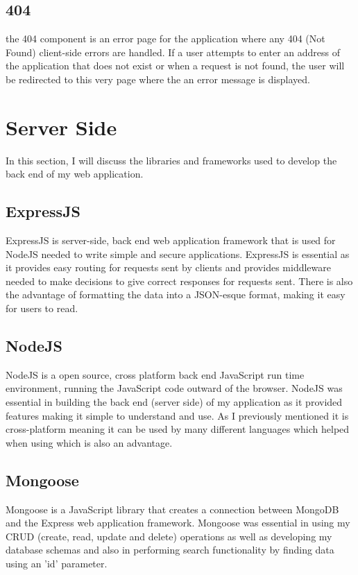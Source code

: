 \subsection{404}

the 404 component is an error page for the application where any 404 (Not Found) client-side errors are handled. If a user attempts to enter an address of the application that does not exist or when a request is not found, the user will be redirected to this very page where the an error message is displayed. 

\section{Server Side}

In this section, I will discuss the libraries and frameworks used to develop the back end of my web application.

\subsection{ExpressJS}

ExpressJS is server-side, back end web application framework that is used for NodeJS needed to write simple and secure applications. ExpressJS is essential as it provides easy routing for requests sent by clients and provides middleware needed to make decisions to give correct responses for requests sent. There is also the advantage of formatting the data into a JSON-esque format, making it easy for users to read.

\subsection{NodeJS}

NodeJS is a open source, cross platform back end JavaScript run time environment, running the JavaScript code outward of the browser. NodeJS was essential in building the back end (server side) of my application as it provided features making it simple to understand and use. As I previously mentioned it is cross-platform meaning it can be used by many different languages which helped when using which is also an advantage.

\subsection{Mongoose}

Mongoose is a JavaScript library that creates a connection between MongoDB and the Express web application framework. Mongoose was essential in using my CRUD (create, read, update and delete) operations as well as developing my database schemas and also in performing search functionality by finding data using an 'id' parameter.

